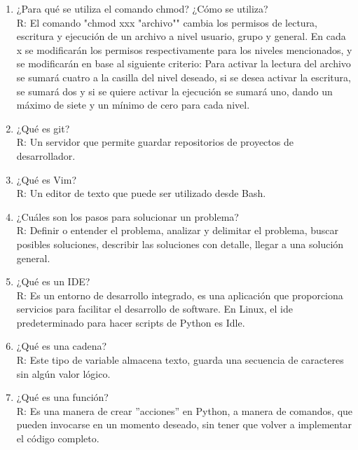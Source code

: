 \documentclass[letterpaper, 12pt, oneside]{article} %
\begin{document}
\begin{enumerate}
		\item ¿Para qué se utiliza el comando chmod? ¿Cómo se utiliza?\\R: El comando "chmod xxx "archivo"" cambia los permisos de lectura, escritura y ejecución de un archivo a nivel usuario, grupo y general. En cada x se modificarán los permisos respectivamente para los niveles mencionados, y se modificarán en base al siguiente criterio: Para activar la lectura del archivo se sumará cuatro a la casilla del nivel deseado, si se desea activar la escritura, se sumará dos y si se quiere activar la ejecución se sumará uno, dando un máximo de siete y un mínimo de cero para cada nivel.\\
		\item ¿Qué es git?\\R: Un servidor que permite guardar repositorios de proyectos de desarrollador.\\
		\item ¿Qué es Vim?\\R: Un editor de texto que puede ser utilizado desde Bash.\\
		\item ¿Cuáles son los pasos para solucionar un problema?\\R: Definir o entender el problema, analizar y delimitar el problema, buscar posibles soluciones, describir las soluciones con detalle, llegar a una solución general.\\
		\item ¿Qué es un IDE?\\R: Es un entorno de desarrollo integrado, es una aplicación que proporciona servicios para facilitar el desarrollo de software. En Linux, el ide predeterminado para hacer scripts de Python es Idle.
		\item ¿Qué es una cadena?\\R: Este tipo de variable almacena texto, guarda una secuencia de caracteres sin algún valor lógico.
		\item ¿Qué es una función?\\R: Es una manera de crear ”acciones” en Python, a manera de comandos, que pueden invocarse en un momento deseado, sin tener que volver a implementar el código completo.
	\end{enumerate}
\end{document}
